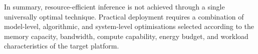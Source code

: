 In summary, resource-efficient inference is not achieved through a single
universally optimal technique. Practical deployment requires a combination of
model-level, algorithmic, and system-level optimisations selected according to
the memory capacity, bandwidth, compute capability, energy budget, and workload
characteristics of the target platform.